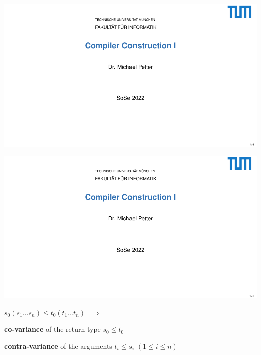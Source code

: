\documentclass[10pt, landscape]{article}
\theoremstyle{definition}
\begin{document}
\begin{multicols*}{3}
\includegraphics[page=238, width=\columnwidth, trim= 3cm .5cm 3cm 5cm, clip]{./selfservice-handout.pdf}

\includegraphics[page=239, width=\columnwidth, trim= 4cm 6cm 4cm 1cm, clip]{./selfservice-handout.pdf}

\begin{center} $s_{0} (s_{1} \dots s_{n}) \le t_{0} (t_{1} \dots t_{n})$ $\implies$ \end{center}
\begin{compactenum}
  \item \textbf{co-variance} of the return type $s_{0} \le t_{0}$
  \item \textbf{contra-variance} of the arguments $t_{i} \le s_{i}$ $(1 \le i \le n)$
\end{compactenum}


\end{multicols*}

\pagebreak
\end{document}
